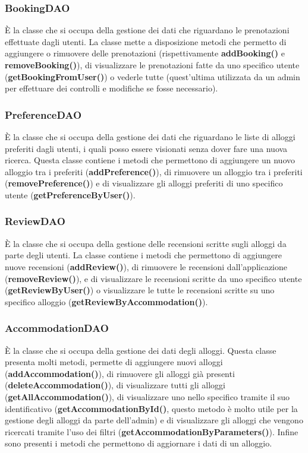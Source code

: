 \documentclass[10pt]{article}
\begin{document}
\subsubsection{BookingDAO}

\`E la classe che si occupa della gestione dei dati che riguardano le prenotazioni effettuate dagli utenti. La classe mette a disposizione metodi che permetto di aggiungere o rimuovere delle prenotazioni (rispettivamente \textbf{addBooking()} e \textbf{removeBooking()}), di visualizzare le prenotazioni fatte da uno specifico utente (\textbf{getBookingFromUser()}) o vederle tutte (quest'ultima utilizzata da un admin per effettuare dei controlli e modifiche se fosse necessario).

\subsubsection{PreferenceDAO}

\`E la classe che si occupa della gestione dei dati che riguardano le liste di alloggi preferiti dagli utenti, i quali posso essere visionati senza dover fare una nuova ricerca. Questa classe contiene i metodi che permettono di aggiungere un nuovo alloggio tra i preferiti (\textbf{addPreference()}), di rimuovere un alloggio tra i preferiti (\textbf{removePreference()}) e di visualizzare gli alloggi preferiti di uno specifico utente (\textbf{getPreferenceByUser()}). 

\subsubsection{ReviewDAO}

\`E la classe che si occupa della gestione delle recensioni scritte sugli alloggi da parte degli utenti. La classe contiene i metodi che permettono di aggiungere nuove recensioni (\textbf{addReview()}), di rimuovere le recensioni dall'applicazione (\textbf{removeReview()}), e di visualizzare le recensioni scritte da uno specifico utente (\textbf{getReviewByUser()}) o visualizzare le tutte le recensioni scritte su uno specifico alloggio (\textbf{getReviewByAccommodation()}). 

\subsubsection{AccommodationDAO}

\`E la classe che si occupa della gestione dei dati degli alloggi. Questa classe presenta molti metodi, permette di aggiungere nuovi alloggi (\textbf{addAccommodation()}), di rimuovere gli alloggi già presenti (\textbf{deleteAccommodation()}), di visualizzare tutti gli alloggi (\textbf{getAllAccommodation()}), di visualizzare uno nello specifico tramite il suo identificativo (\textbf{getAccommodationById()}, questo metodo è molto utile per la gestione degli alloggi da parte dell'admin) e di visualizzare gli alloggi che vengono ricercati tramite l'uso dei filtri
(\textbf{getAccommodationByParameters()}). Infine sono presenti i metodi che permettono di aggiornare i dati di un alloggio. 
\end{document}
